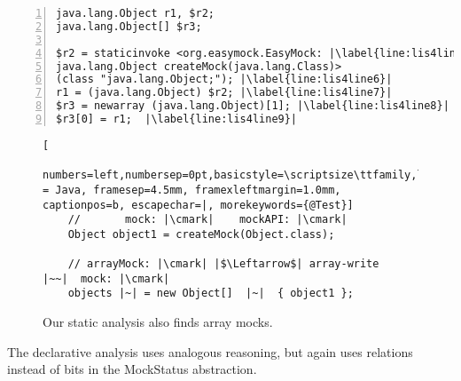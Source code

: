 \begin{lstlisting}[basicstyle=\ttfamily, caption={Jimple Intermediate Representation for the array in Figure~\ref{fig:arrayMockIllustration}.},
numbers=left,numbersep=2pt,basicstyle=\scriptsize\ttfamily, framesep=4.5mm, framexleftmargin=1.0mm, captionpos=b, label=lis:arrayIllustrationIR, escapechar=|, morekeywords={@Test, specialinvoke, virtualinvoke, staticinvoke, newarray}]
java.lang.Object r1, $r2;
java.lang.Object[] $r3;

$r2 = staticinvoke <org.easymock.EasyMock: |\label{line:lis4line4}|
java.lang.Object createMock(java.lang.Class)>
(class "java.lang.Object;"); |\label{line:lis4line6}|
r1 = (java.lang.Object) $r2; |\label{line:lis4line7}|
$r3 = newarray (java.lang.Object)[1]; |\label{line:lis4line8}|
$r3[0] = r1;  |\label{line:lis4line9}|
\end{lstlisting}

\begin{figure}[h]
	\begin{lstlisting}[
	numbers=left,numbersep=0pt,basicstyle=\scriptsize\ttfamily,language = Java, framesep=4.5mm, framexleftmargin=1.0mm, captionpos=b, escapechar=|, morekeywords={@Test}]
	//       mock: |\cmark|    mockAPI: |\cmark|
	Object object1 = createMock(Object.class);
	
	// arrayMock: |\cmark| |$\Leftarrow$| array-write    |~~|  mock: |\cmark|
	objects |~| = new Object[]  |~|  { object1 };
	\end{lstlisting}
	
	\caption{Our static analysis also finds array mocks.}
	\label{fig:arrayMockIllustration}
	
\end{figure}

The declarative analysis uses analogous reasoning, but again uses relations instead of bits in the MockStatus abstraction.
